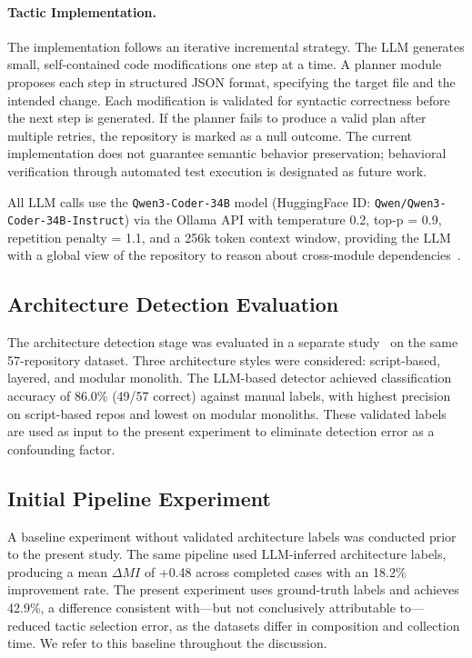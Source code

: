 \documentclass[sigconf,review,anonymous]{acmart}
\begin{document}
\paragraph{Tactic Implementation.} The implementation follows an iterative incremental strategy. The LLM generates small, self-contained code modifications one step at a time. A planner module proposes each step in structured JSON format, specifying the target file and the intended change. Each modification is validated for syntactic correctness before the next step is generated. If the planner fails to produce a valid plan after multiple retries, the repository is marked as a null outcome. The current implementation does not guarantee semantic behavior preservation; behavioral verification through automated test execution is designated as future work.

All LLM calls use the \texttt{Qwen3-Coder-34B} model (HuggingFace ID: \texttt{Qwen/Qwen3-Coder-34B-Instruct}) via the Ollama API with temperature 0.2, top-p = 0.9, repetition penalty = 1.1, and a 256k token context window, providing the LLM with a global view of the repository to reason about cross-module dependencies~\cite{piao2025refactoring}.

\subsection{Architecture Detection Evaluation}
\label{sec:eval_arch_detection}

The architecture detection stage was evaluated in a separate study~\cite{chertkov_2026_20051151} on the same 57-repository dataset. Three architecture styles were considered: script-based, layered, and modular monolith. The LLM-based detector achieved classification accuracy of 86.0\% (49/57 correct) against manual labels, with highest precision on script-based repos and lowest on modular monoliths. These validated labels are used as input to the present experiment to eliminate detection error as a confounding factor.

\subsection{Initial Pipeline Experiment}
\label{sec:eval_pipeline}

A baseline experiment without validated architecture labels was conducted prior to the present study. The same pipeline used LLM-inferred architecture labels, producing a mean $\Delta MI$ of +0.48 across completed cases with an 18.2\% improvement rate. The present experiment uses ground-truth labels and achieves 42.9\%, a difference consistent with---but not conclusively attributable to---reduced tactic selection error, as the datasets differ in composition and collection time. We refer to this baseline throughout the discussion.
\end{document}
